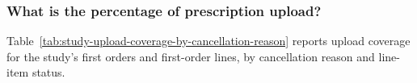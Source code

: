 \subsubsection{What is the percentage of prescription upload?}
\label{subsec:study-upload-coverage}
Table~\ref{tab:study-upload-coverage-by-cancellation-reason} reports upload coverage
for the study's first orders and first-order lines, by cancellation reason and line-item status.











\clearpage

\clearpage
\nolinenumbers

